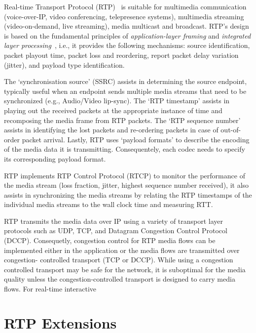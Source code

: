 
Real-time Transport Protocol (RTP)~\cite{rfc3550} is suitable for multimedia
communication (voice-over-IP, video conferencing, telepresence systems),
multimedia streaming (video-on-demand, live streaming), media multicast and
broadcast. RTP's design is based on the fundamental principles of \textit
{application-layer framing} and \textit{integrated layer
processing}~\cite{clark:alf}, i.e., it provides the following mechanisms:
source identification, packet playout time, packet loss and reordering, report
packet delay variation (jitter), and payload type identification. 

The `synchronisation source' (SSRC) assists in determining the source
endpoint, typically useful when an endpoint sends multiple media streams that
need to be synchronized (e.g., Audio/Video lip-sync). The `RTP timestamp'
assists in playing out the received packets at the appropriate instance of
time and recomposing the media frame from RTP packets. The `RTP sequence
number' assists in identifying the lost packets and re-ordering packets in
case of out-of-order packet arrival. Lastly, RTP uses `payload formats' to
describe the encoding of the media data it is transmitting. Consequentely,
each codec needs to specify its corresponding payload format.

RTP implements RTP Control Protocol (RTCP) to monitor the performance of the
media stream (loss fraction, jitter, highest sequence number received), it
also assists in synchronizing the media streams by relating  the RTP
timestamps of the individual media streams to the wall clock time and measuring
RTT.




RTP transmits the media data over IP using a variety of transport layer
protocols such as UDP, TCP, and Datagram Congestion Control Protocol (DCCP).
Consequetly, congestion control for RTP media flows can be implemented either
in the application or the media flows are transmitted over congestion-
controlled transport (TCP or DCCP). While using a congestion controlled
transport may be safe for the network, it is suboptimal for the media quality
unless the congestion-controlled transport is designed to carry media flows.
For real-time interactive




\section{RTP Extensions}
\label{rtp.ext}
